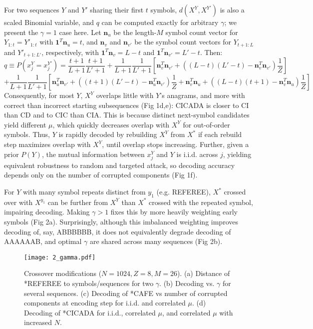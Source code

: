 \documentclass{article}
\begin{document}
For two sequences $Y$ and $Y'$ sharing their first $t$ symbols, $d(X^Y, X^{Y'})$ is also a scaled Binomial variable, and $q$ can be computed exactly for arbitrary $\gamma$; we present the $\gamma = 1$ case here. Let $\mathbf{n}_u$ be the length-$M$ symbol count vector for $Y_{1:t} = Y'_{1:t}$ with $\mathbf{1}^T\mathbf{n}_u = t$, and $\mathbf{n}_v$ and $\mathbf{n}_{v'}$ be the symbol count vectors for $Y_{t+1:L}$ and $Y'_{t+1:L'}$, respectively, with $\mathbf{1}^T\mathbf{n}_{v} = L - t$ and $\mathbf{1}^T\mathbf{n}_{v'} = L' - t$. Then:
$$q \equiv P(x_j^Y = x_j^{Y'}) = \frac{t+1}{L+1}\frac{t+1}{L'+1} + \frac{1}{L+1}\frac{1}{L'+1}\left[\mathbf{n}^T_v\mathbf{n}_{v'} + \left((L-t)(L'-t) - \mathbf{n}^T_v\mathbf{n}_{v'} \right)\frac{1}{Z}\right]$$
$$+\frac{1}{L+1}\frac{1}{L'+1}\left[
\mathbf{n}^T_{u}\mathbf{n}_{v'} + \left((t+1)(L'-t) - \mathbf{n}^T_{u}\mathbf{n}_{v'} \right)\frac{1}{Z}
+ \mathbf{n}^T_{v}\mathbf{n}_{u} + \left((L-t)(t+1) - \mathbf{n}^T_{v}\mathbf{n}_{u} \right)\frac{1}{Z}
\right]$$
Consequently, for most $Y$, $X^Y$ overlaps little with $Y$'s anagrams, and more with correct than incorrect starting subsequences (Fig 1d,e): CICADA is closer to CI than CD and to CIC than CIA. This is because distinct next-symbol candidates yield different $\mu$, which quickly decreases overlap with $X^Y$ for out-of-order symbols. Thus, $Y$ is rapidly decoded by rebuilding $X^Y$ from $X^*$ if each rebuild step maximizes overlap with $X^Y$, until overlap stops increasing. Further, given a prior $P(Y)$, the mutual information between $x_j^Y$ and $Y$ is i.i.d. across $j$, yielding equivalent robustness to random and targeted attack, so decoding accuracy depends only on the number of corrupted components (Fig 1f).

For $Y$ with many symbol repeats distinct from $y_1$ (e.g. REFEREE), $X^*$ crossed over with $X^{y_1}$ can be further from $X^Y$ than $X^*$ crossed with the repeated symbol, impairing decoding. Making $\gamma > 1$ fixes this by more heavily weighting early symbols (Fig 2a). Surprisingly, although this imbalanced weighting improves decoding of, say, ABBBBBB, it does not equivalently degrade decoding of AAAAAAB, and optimal $\gamma$ are shared across many sequences (Fig 2b).

\begin{figure}
\label{fig:2}
  \centering
  \texttt{[image: 2\_gamma.pdf]}
  \caption{Crossover modifications ($N=1024, Z=8, M=26$). (a) Distance of *REFEREE to symbols/sequences for two $\gamma$. (b) Decoding vs. $\gamma$ for several sequences. (c) Decoding of *CAFE vs number of corrupted components at encoding step for i.i.d. and correlated $\mu$. (d) Decoding of *CICADA for i.i.d., correlated $\mu$, and correlated $\mu$ with increased $N$.}
\end{figure}
\end{document}
